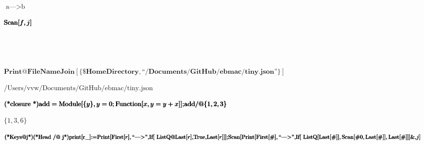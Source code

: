 \documentclass{article}
\newcommand{\unicode}[1]{{}}
\begin{document}
\begin{doublespace}
\noindent\(\pmb{\text{}}\)
\end{doublespace}

\noindent\(\text{a}\text{---$>$}\text{b}\)

\begin{doublespace}
\noindent\(\pmb{\text{Scan}[}\\
\pmb{f}\\
\pmb{}\\
\pmb{,j]}\)
\end{doublespace}

\begin{doublespace}
\noindent\(\pmb{\text{}}\)
\end{doublespace}

\begin{doublespace}
\noindent\(\pmb{\text{}}\)
\end{doublespace}

\begin{doublespace}
\noindent\(\pmb{\text{Print}@\text{FileNameJoin}[\{\text{$\$$HomeDirectory},\text{{``}/Documents/GitHub/ebmac/tiny.json{''}}\}]}\)
\end{doublespace}

\noindent\(\text{/Users/vvw/Documents/GitHub/ebmac/tiny.json}\)

\begin{doublespace}
\noindent\(\pmb{\text{(*closure $\unicode{95ed}\unicode{5305}$*)}}\\
\pmb{\text{add}=\text{Module}[\{y\},y=0;\text{Function}[x, y=y+x]];}\\
\pmb{\text{add} \text{/@} \{1,2,3\}}\)
\end{doublespace}

\begin{doublespace}
\noindent\(\{1,3,6\}\)
\end{doublespace}

\begin{doublespace}
\noindent\(\pmb{\text{(*Keys@j*)}}\\
\pmb{\text{(*Head /@ j*)}}\\
\pmb{\text{print}[\text{r$\_$}]\text{:=}\text{Print}[\text{First}[r],\text{{``}---$>${''}},}\\
\pmb{\text{If}[\text{  }}\\
\pmb{\text{ListQ}@\text{Last}[r],}\\
\pmb{\text{True},}\\
\pmb{\text{Last}[r]]}\\
\pmb{];}\\
\pmb{\text{Scan}[}\\
\pmb{\text{Print}[}\\
\pmb{\text{First}[\#],\text{{``}---$>${''}},}\\
\pmb{\text{If}[\text{  }\text{ListQ}[ \text{Last}[\#]],\text{Scan}[\text{$\#$0}, \text{Last}[\#] ],\text{Last}[\#]] }\\
\pmb{]\&}\\
\pmb{, }\\
\pmb{j]}\)
\end{doublespace}
\end{document}
